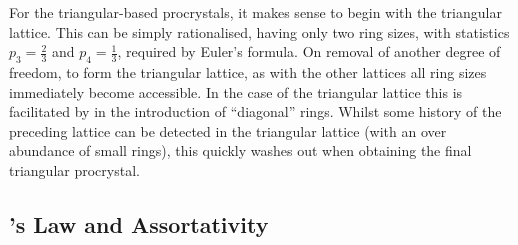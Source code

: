 For the triangular\--based procrystals, it makes sense to begin with the triangular lattice.
This can be simply rationalised, having only two ring sizes, with statistics $p_3=\frac{2}{3}$ and $p_4=\frac{1}{3}$, required by Euler's formula.
On removal of another degree of freedom, to form the triangular lattice, as with the other lattices all ring sizes immediately become accessible.
In the case of the triangular lattice this is facilitated by in the introduction of ``diagonal'' rings.
Whilst some history of the preceding lattice can be detected in the triangular lattice (with an over abundance of small rings), this quickly washes out when obtaining the final triangular procrystal.

\subsection{\lm's Law and Assortativity}

